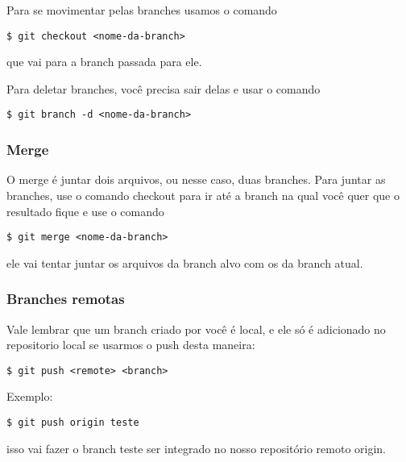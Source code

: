 \documentclass{article}
\begin{document}
    Para se movimentar pelas branches usamos o comando
\begin{tabbing}
    \hspace{1cm}\=\verb#$ git checkout <nome-da-branch>#
\end{tabbing}
    que vai para a branch passada para ele.

    Para deletar branches, você precisa sair delas e usar o comando
\begin{tabbing}
    \hspace{1cm}\=\verb#$ git branch -d <nome-da-branch>#
\end{tabbing}

\subsubsection{Merge}
    O merge é juntar dois arquivos, ou nesse caso, duas branches. Para juntar as
branches, use o comando checkout para ir até a branch na qual você quer que o resultado
fique e use o comando 
\begin{tabbing}
    \hspace{1cm}\=\verb#$ git merge <nome-da-branch>#
\end{tabbing}
ele vai tentar juntar os arquivos da branch alvo com os da branch atual.


\subsubsection{Branches remotas}

Vale lembrar que um branch criado por você é local, e ele só é adicionado no repositorio 
local se usarmos o push desta maneira:
\begin{tabbing}
    \hspace{1cm}\=\verb#$ git push <remote> <branch>#\\
\end{tabbing} 
Exemplo: 
\begin{tabbing}
    \hspace{1cm}\=\verb#$ git push origin teste#\\
\end{tabbing} 
isso vai fazer o branch teste ser integrado no nosso repositório remoto origin.
\end{document}
